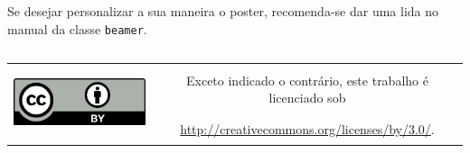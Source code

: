 \documentclass[]{beamer}
\begin{document}
\begin{frame}[t,fragile]
\begin{columns}[t]
\begin{column}{0.4\textwidth}
      Se desejar personalizar a sua maneira o poster, recomenda-se dar uma lida no
      manual da classe \lstinline+beamer+.
    \end{column}
  \end{columns}
  \vfill
  \begin{center}
    \begin{tabular}[]{cc}
      \multirow{2}{*}{\includegraphics[height=60pt]{figuras/cc-by}} &
      \Large{Exceto indicado o contrário, este trabalho é licenciado sob}\\
      & \Large{\url{http://creativecommons.org/licenses/by/3.0/}.}
    \end{tabular}
  \end{center}
\end{frame}
\end{document}
